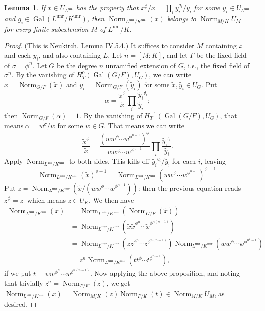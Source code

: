 \documentclass[12pt]{article}
\DeclareMathOperator{\Gal}{Gal}
\DeclareMathOperator{\Norm}{Norm}
\DeclareMathOperator{\unr}{unr}
\newtheorem{lemma}[theorem]{Lemma}
\begin{document}
\begin{lemma}
If $x \in U_{L^{\unr}}$ has the property that $x^\phi/x
= \prod_i y_i^{g_i}/y_i$ for some $y_i \in U_{L^{\unr}}$ and $g_i \in
\Gal(L^{\unr}/K^{\unr})$, then $\Norm_{L^{\unr}/K^{\unr}}(x)$ belongs to
$\Norm_{M/K} U_M$ for every finite subextension $M$ of $L^{\unr}/K$.
\end{lemma}
\begin{proof}
(This is Neukirch, Lemma IV.5.4.)
It suffices to consider $M$ containing $x$ and each $y_i$,
and also containing $L$.
Let $n = [M:K]$, and let $F$ be the fixed field of $\sigma = \phi^n$.
Let $G$ be the degree $n$ unramified extension of $G$, i.e., the fixed
field of $\sigma^n$. By the vanishing of $H^0_T(\Gal(G/F), U_G)$, we can
write $x = \Norm_{G/F}(\tilde{x})$ and $y_i = \Norm_{G/F}(\tilde{y}_i)$
for some $\tilde{x}, \tilde{y_i} \in U_G$. Put
\[
\alpha = \frac{\tilde{x}^{\phi}}{\tilde{x}} \prod_i \frac{\tilde{y}_i}{\tilde{y}_i}^{g_i};
\]
then $\Norm_{G/F}(\alpha) = 1$. By the vanishing of $H^{-1}_T(\Gal(G/F), U_G)$,
that means $\alpha = w^\sigma/w$ for some $w \in G$. That means we can write
\[
\frac{\tilde{x}^\phi}{\tilde{x}}
= \frac{(w w^\phi\cdots w^{\phi^{n-1}})^\phi}{w w^\phi \cdots w^{\phi^{n-1}}}
\prod_i \frac{\tilde{y_i}^{g_i}}{\tilde{y_i}}.
\]
Apply $\Norm_{L^{\unr}/K^{\unr}}$ to both sides. This kills off
$\tilde{y_i}^{g_i}/\tilde{y_i}$ for each $i$, leaving
\[
\Norm_{L^{\unr}/K^{\unr}}(\tilde{x})^{\phi-1}
= \Norm_{L^{\unr}/K^{\unr}}(w w^\phi\cdots w^{\phi^{n-1}})^{\phi-1}.
\]
Put $z = \Norm_{L^{\unr}/K^{\unr}}(\tilde{x} / (w w^{\phi} \cdots w^{\phi^{n-1}}))$; then the previous equation reads $z^\phi = z$, which means 
$z \in U_K$. We then have
\begin{align*}
  \Norm_{L^{\unr}/K^{\unr}}(x) &= \Norm_{L^{\unr}/K^{\unr}}(
\Norm_{G/F}(\tilde{x})) \\
&= \Norm_{L^{\unr}/K^{\unr}}(\tilde{x} \tilde{x}^{\phi^n} \cdots
\tilde{x}^{\phi^{n(n-1)}}) \\
&= \Norm_{L^{\unr}/K^{\unr}}(z z^{\phi^n} \cdots z^{\phi^{n(n-1)}})
\Norm_{L^{\unr}/K^{\unr}}(w w^{\phi} \cdots w^{\phi^{n^2-1}}) \\
&= z^n \Norm_{L^{\unr}/K^{\unr}}(t t^\phi \cdots t^{\phi^{n-1}}),
\end{align*}
if we put $t = w w^{\phi^n} \cdots w^{\phi^{n(n-1)}}$. Now applying the
above proposition, and noting that trivially $z^n = \Norm_{F/K}(z)$,
we get $\Norm_{L^{\unr}/K^{\unr}}(x) = \Norm_{M/K}(z) \Norm_{F/K}(t)
\in \Norm_{M/K} U_M$, as desired.
\end{proof}
\end{document}
